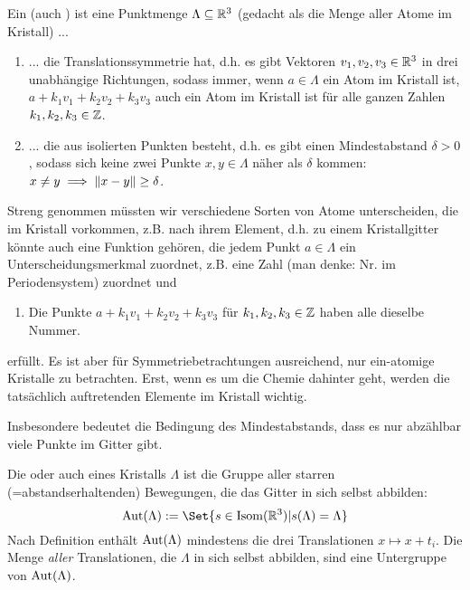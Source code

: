 
\begin{definition}[Kristalle]
Ein  (auch ) ist eine Punktmenge $\Lambda\subseteq\mathbb{R}^3$ (gedacht als die Menge aller Atome im Kristall) ...
\begin{enumerate}
\item ... die Translationssymmetrie hat, d.h. es gibt Vektoren $v_1,v_2,v_3\in\mathbb{R}^3$ in drei unabhängige Richtungen, sodass immer, wenn $a\in\Lambda$ ein Atom im Kristall ist, $a+k_1v_1+k_2v_2+k_3v_3$ auch ein Atom im Kristall ist für alle ganzen Zahlen $k_1,k_2,k_3\in\mathbb{Z}$.
\item ... die aus isolierten Punkten besteht, d.h. es gibt einen Mindestabstand $\delta>0$, sodass sich keine zwei Punkte $x,y\in\Lambda$ näher als $\delta$ kommen: $x\neq y \implies\lVert x-y\rVert\geq\delta$.
\end{enumerate}
Streng genommen müssten wir verschiedene Sorten von Atome unterscheiden, die im Kristall vorkommen, z.B. nach ihrem Element, d.h. zu einem Kristallgitter könnte auch eine Funktion gehören, die jedem Punkt $a\in\Lambda$ ein Unterscheidungsmerkmal zuordnet, z.B. eine Zahl (man denke: Nr. im Periodensystem) zuordnet und
\begin{enumerate}[resume]
\item Die Punkte $a+k_1v_1+k_2v_2+k_3v_3$ für $k_1,k_2,k_3\in\mathbb{Z}$ haben alle dieselbe Nummer.
\end{enumerate}
erfüllt. Es ist aber für Symmetriebetrachtungen ausreichend, nur ein-atomige Kristalle zu betrachten. Erst, wenn es um die Chemie dahinter geht, werden die tatsächlich auftretenden Elemente im Kristall wichtig.
\end{definition}

\begin{remark}
Insbesondere bedeutet die Bedingung des Mindestabstands, dass es nur abzählbar viele Punkte im Gitter gibt.
\end{remark}

\begin{definition}
Die  oder auch  eines Kristalls $\Lambda$ ist die Gruppe aller starren (=abstandserhaltenden) Bewegungen, die das Gitter in sich selbst abbilden:
\[\Aut(\Lambda) := \Set{s\in \operatorname{Isom}(\IR^3) | s(\Lambda)=\Lambda}\]
Nach Definition enthält $\operatorname{Aut}(\Lambda)$ mindestens die drei Translationen $x\mapsto x+t_i$. Die Menge \emph{aller} Translationen, die $\Lambda$ in sich selbst abbilden, sind eine Untergruppe von $\operatorname{Aut}(\Lambda)$.
\end{definition}

